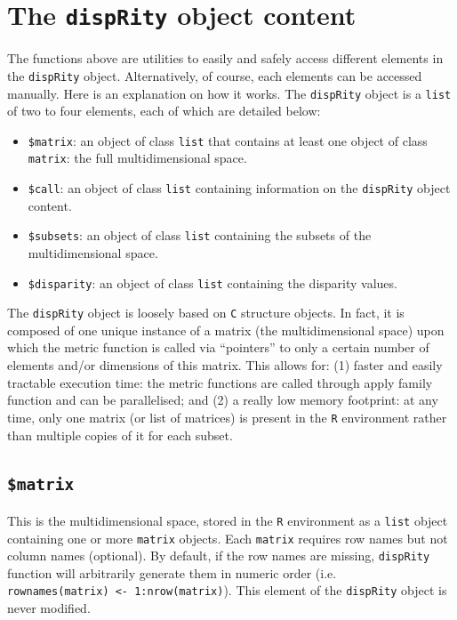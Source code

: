 \documentclass[]{book}
\providecommand{\tightlist}{%
  \setlength{\itemsep}{0pt}\setlength{\parskip}{0pt}}
\begin{document}
\hypertarget{the-disprity-object-content}{%
\section{\texorpdfstring{The \texttt{dispRity} object content}{The dispRity object content}}\label{the-disprity-object-content}}

The functions above are utilities to easily and safely access different elements in the \texttt{dispRity} object.
Alternatively, of course, each elements can be accessed manually.
Here is an explanation on how it works.
The \texttt{dispRity} object is a \texttt{list} of two to four elements, each of which are detailed below:

\begin{itemize}
\tightlist
\item
  \texttt{\$matrix}: an object of class \texttt{list} that contains at least one object of class \texttt{matrix}: the full multidimensional space.
\item
  \texttt{\$call}: an object of class \texttt{list} containing information on the \texttt{dispRity} object content.
\item
  \texttt{\$subsets}: an object of class \texttt{list} containing the subsets of the multidimensional space.
\item
  \texttt{\$disparity}: an object of class \texttt{list} containing the disparity values.
\end{itemize}

The \texttt{dispRity} object is loosely based on \texttt{C} structure objects.
In fact, it is composed of one unique instance of a matrix (the multidimensional space) upon which the metric function is called via ``pointers'' to only a certain number of elements and/or dimensions of this matrix.
This allows for: (1) faster and easily tractable execution time: the metric functions are called through apply family function and can be parallelised; and (2) a really low memory footprint: at any time, only one matrix (or list of matrices) is present in the \texttt{R} environment rather than multiple copies of it for each subset.

\hypertarget{matrix}{%
\subsection{\texorpdfstring{\texttt{\$matrix}}{\$matrix}}\label{matrix}}

This is the multidimensional space, stored in the \texttt{R} environment as a \texttt{list} object containing one or more \texttt{matrix} objects.
Each \texttt{matrix} requires row names but not column names (optional).
By default, if the row names are missing, \texttt{dispRity} function will arbitrarily generate them in numeric order (i.e. \texttt{rownames(matrix)\ \textless{}-\ 1:nrow(matrix)}).
This element of the \texttt{dispRity} object is never modified.
\end{document}
